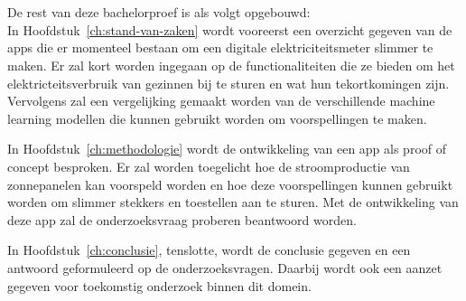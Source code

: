 \section{}%
\label{sec:opzet-bachelorproef}


De rest van deze bachelorproef is als volgt opgebouwd: \\

In Hoofdstuk~\ref{ch:stand-van-zaken} wordt vooreerst een overzicht gegeven van de apps die er momenteel bestaan om een digitale elektriciteitsmeter slimmer te maken. Er zal kort worden ingegaan op de functionaliteiten die ze bieden om het elektricteitsverbruik van gezinnen bij te sturen en wat hun tekortkomingen zijn. Vervolgens zal een vergelijking gemaakt worden van de verschillende machine learning modellen die kunnen gebruikt worden om voorspellingen te maken.

In Hoofdstuk~\ref{ch:methodologie} wordt de ontwikkeling van een app als proof of concept besproken. Er zal worden toegelicht hoe de stroomproductie van zonnepanelen kan voorspeld worden en hoe deze voorspellingen kunnen gebruikt worden om slimmer stekkers en toestellen aan te sturen. Met de ontwikkeling van deze app zal de onderzoeksvraag proberen beantwoord worden.


In Hoofdstuk~\ref{ch:conclusie}, tenslotte, wordt de conclusie gegeven en een antwoord geformuleerd op de onderzoeksvragen. Daarbij wordt ook een aanzet gegeven voor toekomstig onderzoek binnen dit domein.